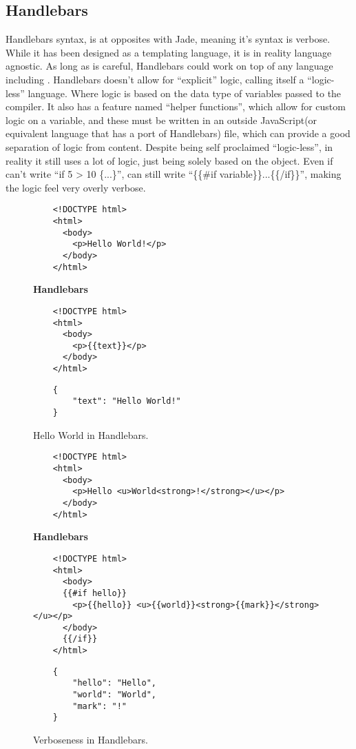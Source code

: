 \subsection{Handlebars}
Handlebars syntax, is at opposites with Jade, meaning it's syntax is verbose. While it has been designed as a  templating language, it is in reality language agnostic. As long as \you{} is careful, Handlebars could work on top of any language including \languageName{}. Handlebars doesn't allow for ``explicit'' logic, calling itself a ``logic-less'' language. Where logic is based on the data type of variables passed to the compiler. It also has a feature named ``helper functions'', which allow for custom logic on a variable, and these must be written in an outside JavaScript(or equivalent language that has a port of Handlebars) file, which can provide a good separation of logic from content. Despite being self proclaimed ``logic-less'', in reality it still uses a lot of logic, just being solely based on the object. Even if \you{} can't write ``if 5 > 10 \{...\}'', \you{} can still write ``\{\{\#if variable\}\}...\{\{/if\}\}'', making the logic feel very overly verbose.

\begin{figure}[!htbp]
    \Large{\textbf{}}\normalsize{}
    \begin{verbatim}
    <!DOCTYPE html>
    <html>
      <body>
        <p>Hello World!</p>
      </body>
    </html>
    \end{verbatim}
    \Large{\textbf{Handlebars}}\normalsize{}
    \begin{verbatim}
    <!DOCTYPE html>
    <html>
      <body>
        <p>{{text}}</p>
      </body>
    </html>
    \end{verbatim}
    \Large{\textbf{}}\normalsize{}
    \begin{verbatim}
    {
        "text": "Hello World!"
    }
    \end{verbatim}
    \caption{Hello World in Handlebars.}
    \label{fig:HandlebarsHelloWorld}
\end{figure}

\begin{figure}[!htbp]
    \Large{\textbf{}}\normalsize{}
    \begin{verbatim}
    <!DOCTYPE html>
    <html>
      <body>
        <p>Hello <u>World<strong>!</strong></u></p>
      </body>
    </html>
    \end{verbatim}
    \Large{\textbf{Handlebars}}\normalsize{}
    \begin{verbatim}
    <!DOCTYPE html>
    <html>
      <body>
      {{#if hello}}
        <p>{{hello}} <u>{{world}}<strong>{{mark}}</strong></u></p>
      </body>
      {{/if}}
    </html>
    \end{verbatim}
    \Large{\textbf{}}\normalsize{}
    \begin{verbatim}
    {
        "hello": "Hello",
        "world": "World",
        "mark": "!"
    }
    \end{verbatim}
    \caption{Verboseness in Handlebars.}
    \label{fig:HandlebarsProblem}
\end{figure}
\newpage

